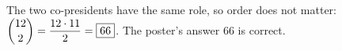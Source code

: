 The two co-presidents have the same role, so order does not matter: $\dbinom{12}{2}=\dfrac{12\cdot11}{2}=\boxed{66}$. The poster's answer $66$ is correct.
